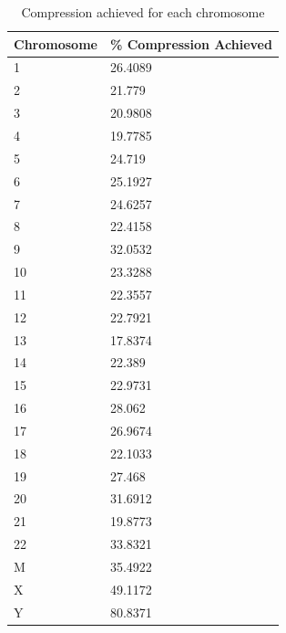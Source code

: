 \documentclass{article}
\begin{document}
\begin{table}
\begin{center}
	\begin{tabular}{|p{1in}|p{1in}|}

	\hline
	Chromosome	&		\% Compression Achieved \\
	\hline
1 & 26.4089\\
	\hline
2 & 21.779\\
	\hline
3 & 20.9808\\
	\hline
4 & 19.7785\\
	\hline
5 & 24.719\\
	\hline
6 & 25.1927\\
	\hline
7 & 24.6257\\
	\hline
8 & 22.4158\\
	\hline
9 & 32.0532\\
	\hline
10 & 23.3288\\
	\hline
11 & 22.3557\\
	\hline
12 & 22.7921\\
	\hline
13 & 17.8374\\
	\hline
14 & 22.389\\
	\hline
15 & 22.9731\\
	\hline
16 & 28.062\\
	\hline
17 & 26.9674\\
	\hline
18 & 22.1033\\
	\hline
19 & 27.468\\
	\hline
20 & 31.6912\\
	\hline
21 & 19.8773\\
	\hline
22 & 33.8321\\
	\hline
M & 35.4922\\
	\hline
X & 49.1172\\
	\hline
Y & 80.8371\\

	\hline
	\end{tabular}
\end{center}
	\caption{Compression achieved for each chromosome}

\end{table}



\clearpage
\end{document}
